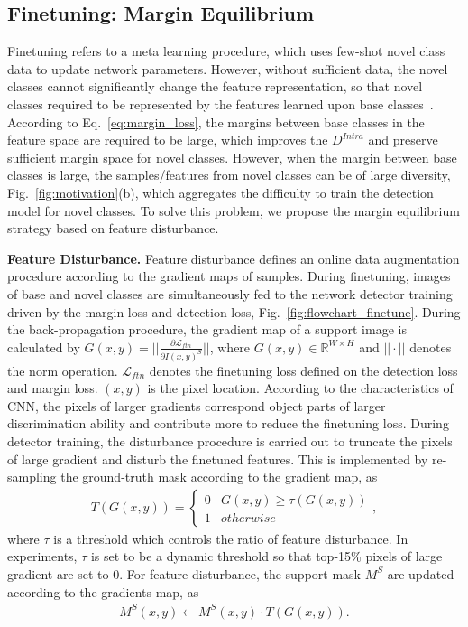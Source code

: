 \documentclass[final]{cvpr}
\begin{document}
\subsection{Finetuning: Margin Equilibrium}
Finetuning refers to a meta learning procedure, which uses few-shot novel class data to update network parameters. However, without sufficient data, the novel classes cannot significantly change the feature representation, so that novel classes required to be represented by the features learned upon base classes~\cite{NegativeMargin}.  According to Eq.\ \ref{eq:margin_loss}, the margins between base classes in the feature space are required to be large, which improves the $D^{Intra}$ and preserve sufficient margin space for novel classes. However, when the margin between base classes is large, the samples/features from novel classes can be of large diversity, Fig.\ \ref{fig:motivation}(b), which aggregates the difficulty to train the detection model for novel classes. To solve this problem, we propose the margin equilibrium strategy based on feature disturbance. 

\textbf{Feature Disturbance.}
Feature disturbance defines an online data augmentation procedure according to the gradient maps of samples. During finetuning, images of base and novel classes are simultaneously fed to the network detector training driven by the margin loss and detection loss, Fig.\ \ref{fig:flowchart_finetune}. During the back-propagation procedure, the gradient map of a support image is calculated by $G(x,y) = ||\frac{\partial {\mathcal{L}}_{ftn}}{\partial I(x,y)^S}||$, where $G(x,y)\in \mathbb{R}^{W\times H}$ and $||\cdot||$ denotes the norm operation. $\mathcal{L}_{ftn}$ denotes the finetuning loss defined on the detection loss and margin loss. $(x,y)$ is the pixel location. According to the characteristics of CNN, the pixels of larger gradients correspond object parts of larger discrimination ability and contribute more to reduce the finetuning loss. During detector training, the disturbance procedure is carried out to truncate the pixels of large gradient and disturb the finetuned features. This is implemented by re-sampling the ground-truth mask according to the gradient map, as 
\begin{align}
T(G{(x,y)})=\begin{cases}
0& G{(x,y)}\geq \tau(G{(x,y)})\\
1& otherwise
\end{cases},
\end{align}
where $\tau$ is a threshold which controls the ratio of feature disturbance. In experiments, $\tau$ is set to be a dynamic threshold so that top-15\% pixels of large gradient are set to 0. For feature disturbance, the support mask $M^S$ are updated according to the gradients map, as
\begin{align}
M^{S}(x,y) \leftarrow M^{S}(x,y) \cdot T(G(x,y)).
\label{eq:mask_iter}
\end{align}
\end{document}
